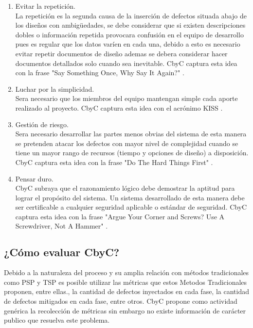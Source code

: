 \documentclass[runningheads,a4paper]{llncs}
\begin{document}
\begin{enumerate}
	\item Evitar la repetición.\\
	
	La repetición es la segunda causa de la inserción de defectos situada abajo de los diseños con ambigüedades, se debe considerar que si existen descripciones dobles o información repetida provocara confusión en el equipo de desarrollo pues es regular que los datos varíen en cada una, debido a esto es necesario evitar repetir documentos de diseño ademas se debera considerar hacer documentos detallados solo cuando sea inevitable. \gls{CbyC} captura esta idea con la frase "Say Something Once, Why Say It Again?" \cite{CbyCIntroduction}.\\ 

	\item Luchar por la simplicidad.\\
	
	Sera necesario que los miembros del equipo mantengan simple cada aporte realizado al proyecto. \gls{CbyC} captura esta idea con el acrónimo \gls{KISS} \cite{CbyCIntroduction}.\\ 
	
	\item Gestión de riesgo.\\
	
	Sera necesario desarrollar las partes menos obvias del sistema de esta manera se pretenden atacar los defectos con mayor nivel de complejidad cuando se tiene un mayor rango de recursos (tiempo y opciones de diseño) a disposición. \gls{CbyC} captura esta idea con la frase "Do The Hard Things First" \cite{CbyCIntroduction}.\\ 
	
	\item Pensar duro.\\
	
	\gls{CbyC} subraya que el razonamiento lógico debe demostrar la aptitud para lograr el propósito del sistema. Un sistema desarrollado de esta manera debe ser certificable a cualquier seguridad aplicable o estándar de seguridad. \gls{CbyC} captura esta idea con la frase "Argue Your Corner and Screws? Use A Screwdriver, Not A Hammer" \cite{CbyCIntroduction}.\\ 
	
\end{enumerate}


\subsection{¿Cómo evaluar \gls{CbyC}?}
Debido a la naturaleza del proceso y su amplia relación con métodos tradicionales como \gls{PSP} y \gls{TSP}  es posible utilizar las métricas que estos \gls{Metodos Tradicionales} proponen, entre ellas., la cantidad de defectos inyectados en cada fase, la cantidad de defectos mitigados en cada fase, entre otros. \gls{CbyC} propone como actividad genérica la recolección de métricas sin embargo no existe información de carácter publico que resuelva este problema.
\end{document}
